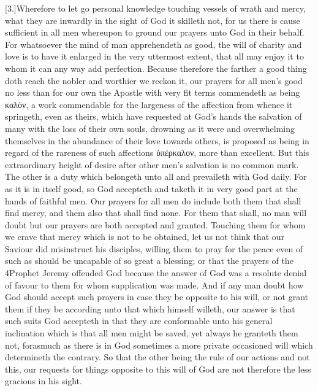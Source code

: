 [3.]Wherefore to let go personal knowledge touching vessels of wrath and mercy, what they are inwardly in the sight of God it skilleth not, for us there is cause sufficient in all men whereupon to ground our prayers unto God in their behalf. For whatsoever the mind of man apprehendeth as good, the will of charity and love is to have it enlarged in the very uttermost extent, that all may enjoy it to whom it can any way add perfection. Because therefore the farther a good thing doth reach the nobler and worthier we reckon it, our prayers for all men’s good no less than for our own the Apostle with very fit terms commendeth as being καλὸν, a work commendable for the largeness of the affection from whence it springeth, even as theirs, which have requested at God’s hands the salvation of many with the loss of their own souls, drowning as it were and overwhelming themselves in the abundance of their love towards others, is proposed as being in regard of the rareness of such affections ὑπέρκαλον, more than excellent. But this extraordinary height of desire after other men’s salvation is no common mark. The other is a duty which belongeth unto all and prevaileth with God daily. For as it is in itself good, so God accepteth and taketh it in very good part at the hands of faithful men. Our prayers for all men do include both them that shall find mercy, and them also that shall find none. For them that shall, no man will doubt but our prayers are both accepted and granted. Touching them for whom we crave that mercy which is not to be obtained, let us not think that our Saviour did misinstruct his disciples, willing them to pray for the peace even of such as should be uncapable of so great a blessing; or that the prayers of the 4Prophet Jeremy offended God because the answer of God was a resolute denial of favour to them for whom supplication was made. And if any man doubt how God should accept such prayers in case they be opposite to his will, or not grant them if they be according unto that which himself willeth, our answer is that such suits God accepteth in that they are conformable unto his general  inclination which is that all men might be saved,
 yet always he granteth them not, forasmuch as there is in God sometimes a more private occasioned will which determineth the contrary. So that the other being the rule of our actions and not this, our requests for things opposite to this will of God are not therefore the less gracious in his sight.

